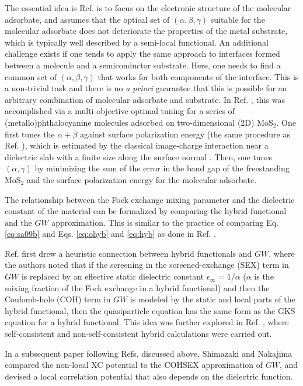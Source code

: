 \documentclass[aip, amsmath, amssymb, reprint, longbibliography]{revtex4-2}
\begin{document}
The essential idea is Ref.  is to focus on the electronic structure of the molecular adsorbate, and assumes that the optical set of $(\alpha,\beta,\gamma)$ suitable for the molecular adsorbate does not deteriorate the properties of the metal substrate, which is typically well described by a semi-local functional. An additional challenge exists if one tends to apply the same approach to interfaces formed between a molecule and a semiconductor substrate. Here, one needs to find a common set of $(\alpha,\beta,\gamma)$ that works for both components of the interface. This is a non-trivial task and there is no \emph{a priori} guarantee that this is possible for an arbitrary combination of molecular adsorbate and substrate. In Ref. , this was accomplished via a multi-objective optimal tuning for a series of (metallo)phthalocyanine molecules adsorbed on two-dimensional (2D) MoS$_2$. One first tunes the $\alpha+\beta$ against surface polarization energy (the same procedure as Ref. ), which is estimated by the classical image-charge interaction near a dielectric slab with a finite size along the surface normal \cite{NCXQ19,CB18}. Then, one tunes $(\alpha,\gamma)$ by minimizing the sum of the error in  the band gap of the freestanding MoS$_2$ and the surface polarization energy for the molecular adsorbate.

The relationship between the Fock exchange mixing parameter and the dielectric constant of the material can be formalized by comparing the hybrid functional and the $GW$ approximation. This is similar to the practice of comparing Eq. \eqref{eq:sa09b} and Eqs. \eqref{eq:ohyb} and \eqref{eq:hyb} as done in Ref. .

Ref.  first drew a heuristic connection between hybrid functionals and $GW$, where the authors noted that if the screening in the screened-exchange (SEX) term in $GW$ is replaced by an effective static dielectric constant $\epsilon_\infty=1/\alpha$ ($\alpha$ is the mixing fraction of the Fock exchange in a hybrid functional) and then the Coulomb-hole (COH) term in $GW$ is modeled by the static and local parts of the hybrid functional, then the quasiparticle equation has the same form as the GKS equation for a hybrid functional. This idea was further explored in Ref. , where self-consistent and non-self-consistent hybrid calculations were carried out.

In a subsequent paper following Refs.  discussed above, Shimazaki and Nakajima \cite{SN14}  compared the non-local XC potential to the COHSEX approximation \cite{H65} of $GW$, and devised a local correlation potential that also depends on the dielectric function.
\end{document}
